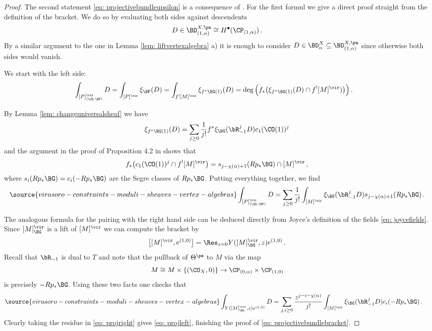 \begin{proof}
The second statement \eqref{eq: projectivebundleupsilon} is a consequence of \cite[Theorem 0.5 (2)]{park}. For the first formul we give a direct proof straight from the definition of the bracket. We do so by evaluating both sides against descendents \[D\in \BD^{X, \pa}_{(1, \alpha)}\cong H^\bullet(\CP_{(1,\alpha)})\,.\] By a similar argument to the one in Lemma \ref{lem: liftvertexalgebra} a) it is enough to consider $D\in \BD^X_\alpha\subseteq \BD^{X, \pa}_{(1, \alpha)}$ since otherwise both sides would vanish.

We start with the left side:
\begin{align}\nonumber
\int_{[P]^\vir_{(\CO,\BF)}}D&=\int_{[P]^\vir}\xi_{\BF}(D)=\int_{f^![M]^\vir}\xi_{f^\ast\BG(1)}(D)=\deg\Big(f_\ast\big(\xi_{f^\ast \BG(1)}(D)\cap f^![M]^\vir)\big)\Big)\,.
\end{align}

By Lemma \ref{lem: changeuniversalsheaf} we have
\[\xi_{f^\ast \BG(1)}(D)=\sum_{j\geq 0}\frac{1}{j!}f^\ast\xi_{\BG}(\bR_{-1}^j D)c_1(\CO(1))^j\]
and the argument in the proof of Proposition 4.2 in \cite{park} shows that
\[f_\ast\big(c_1(\CO(1))^j \cap f^![M]^\vir\big)=s_{j-\chi(\alpha)+1}(Rp_\ast\BG)\cap [M]^\vir\,,\]
where $s_{i}(Rp_\ast \BG)=c_i(-Rp_\ast \BG)$ are the Segre classes of $Rp_\ast \BG$. Putting everything together, we find
\begin{equation}
\label{eq: projleft}
\source{virasoro-constraints-moduli-sheaves-vertex-algebras}
\int_{[P]^\vir_{(\CO,\BF)}}D=\sum_{j\geq 0}\frac{1}{j!} \int_{[M]^\vir} \xi_{\BG}(\bR_{-1}^jD)s_{j-\chi(\alpha)+1}(Rp_\ast \BG)\,.
\end{equation}


The analogous formula for the pairing with the right hand side can be deduced directly from Joyce's definition of the fields \eqref{eq: joycefields}. Since $[M]^\vir_\BG$ is a lift of $[M]^\vir$ we can compute the bracket by
\[\big[[M]^\vir, e^{(1,0)}\big]=\Res_{z=0}Y([M]^\vir_\BG, z)e^{(1,0)}\,.\]
Recall that $\bR_{-1}$ is dual to $T$ and note that the pullback of $\Theta^{\pa}$ to $M$ via the map
\[M\cong  M\times \{(\CO_X, 0)\}\to \CP_{(0,\alpha)}\times \CP_{(1,0)}\]
is precisely $-Rp_\ast \BG$. Using these two facts one checks that
\begin{align}\label{eq: projright}
\source{virasoro-constraints-moduli-sheaves-vertex-algebras}
\int_{Y([M]^\vir_\BG, z)e^{(1,0)}}D&=\sum_{j,i\geq 0}\frac{z^{j-i-\chi(\alpha)}}{j!} \int_{[M]^\vir} \xi_{\BG}(\bR_{-1}^jD)c_{i}(-Rp_\ast \BG)\,.
\end{align}
Clearly taking the residue in \eqref{eq: projright} gives \eqref{eq: projleft}, finishing the proof of \eqref{eq: projectivebundlebracket}.
\end{proof}

